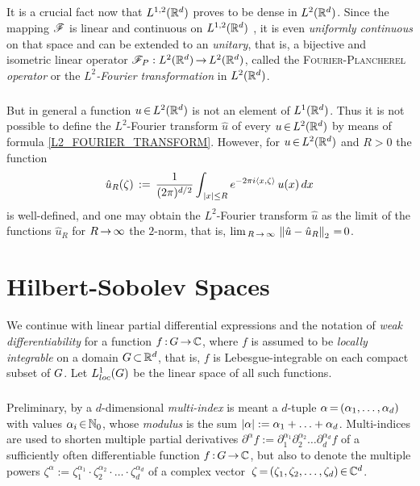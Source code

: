 \documentclass[11pt,twoside]{article}
\begin{document}
\subparagraph*{}
It is a crucial fact now
that $L^{1,2}({\mathbb{R}}^d)$ proves to be dense in $L^2({\mathbb{R}}^d)$.
Since the mapping $\mathscr{F}$ is linear and continuous on $L^{1,2}({\mathbb{R}}^d)$ ,
it is even \textit{uniformly continuous} on that space
and can be extended to an \textit{unitary},
that is,
a bijective and isometric linear operator
$\mathscr{F}_P:L^2({\mathbb{R}}^d) {\,\to\,} L^2({\mathbb{R}}^d)$,
called the \textsc{Fourier-Plancherel} \textit{operator}
or the \textit{$L^2$-Fourier transformation} in $L^2({\mathbb{R}}^d)$.

\subparagraph*{}
But in general a function $u {\,\in\,} L^2({\mathbb{R}}^d)$ is not an element of $L^1({\mathbb{R}}^d)$.
Thus it is not possible to define the $L^2$-Fourier transform $\hat{u}$
of every $u {\,\in\,} L^2({\mathbb{R}}^d)$ by means of formula \eqref{L2_FOURIER_TRANSFORM}.
However,
for $u {\,\in\,} L^2({\mathbb{R}}^d)$ and $R > 0$ the function
\[
\hat{u} _R(\zeta) \eqdef
\frac{1}{(2 \pi)^{d/2}}
\int_{\,\abs{x} \leq R}
e^{-2 \pi i \scalar{x}{\zeta}} \, u(x) \, dx
\]
is well-defined,
and one may obtain the $L^2$-Fourier transform $\hat{u}$ 
as the limit of the functions $\hat{u} _R$ for $R {\,\to\,} \infty$
{\wrt} the $2$-norm,
that is,
$\lim_{\,R {\,\to\,} \infty} \, \left\lVert  \hat{u} - \hat{u} _R \right\rVert_2 {\,=\,} 0$.

\section{Hilbert-Sobolev Spaces}
We continue with linear partial differential expressions and 
the notation of \textit{weak differentiability} for a function $f{\,:\,}G {\,\to\,} {\mathbb{C}}$,
where $f$ is assumed to be \textit{locally integrable}
on a domain $G {\,\subset\,} {\mathbb{R}}^d$,
that is,
$f$ is Lebesgue-integrable on each compact subset of $G$.
Let $L_{loc}^1(G)$ be the linear space of all such functions.

\subparagraph*{}
Preliminary,
by a $d$-dimensional \textit{multi-index} is meant a $d$-tuple
$\alpha {\,=\,} (\alpha_1,\ldots,\alpha_d)$ with values $\alpha_i {\,\in\,} {\mathbb{N}}_0$,
whose \textit{modulus} is the sum
$\abs{\alpha} := \alpha_1 + \ldots + \alpha_d$.
Multi-indices are used to shorten multiple partial derivatives
$
\partial^{\alpha} f := \partial_1^{\alpha_1}
                       \partial_2^{\alpha_2} \ldots
                       \partial_d^{\alpha_d} f
$
of a sufficiently often differentiable function $f{\,:\,}G {\,\to\,} {\mathbb{C}}$,
but also to denote the multiple powers
$\zeta^{\alpha} := \zeta_1^{\alpha_1}
\cdot \zeta_2^{\alpha_2} \cdot \ldots \cdot \zeta_d^{\alpha_d}$
of a complex vector $\,\zeta {\,=\,} (\zeta_1,\zeta_2,\ldots,\zeta_d) {\,\in\,} {\mathbb{C}}^d$.
\end{document}
